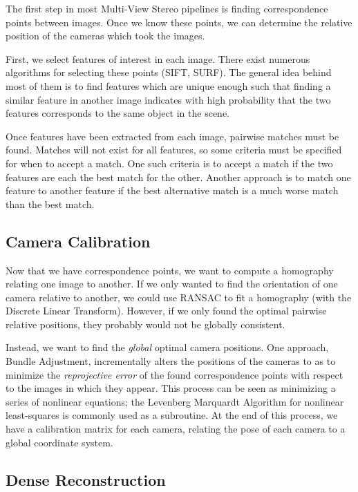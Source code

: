 \documentclass[10pt,twocolumn,letterpaper]{article}
\begin{document}
The first step in most Multi-View Stereo pipelines is finding correspondence points between images. Once we know these points, we can determine the relative position of the cameras which took the images.

First, we select features of interest in each image. There exist numerous algorithms for selecting these points (SIFT, SURF). The general idea behind most of them is to find features which are unique enough such that finding a similar feature in another image indicates with high probability that the two features corresponds to the same object in the scene.\cite{brown}

Once features have been extracted from each image, pairwise matches must be found. Matches will not exist for all features, so some criteria must be specified for when to accept a match. One such criteria is to accept a match if the two features are each the best match for the other. Another approach is to match one feature to another feature if the best alternative match is a much worse match than the best match.\cite{brown}

\subsection{Camera Calibration}

Now that we have correspondence points, we want to compute a homography relating one image to another. If we only wanted to find the orientation of one camera relative to another, we could use RANSAC to fit a homography (with the Discrete Linear Transform).\cite{ransac} However, if we only found the optimal pairwise relative positions, they probably would not be globally consistent.

Instead, we want to find the \emph{global} optimal camera positions. One approach, Bundle Adjustment, incrementally alters the positions of the cameras to as to minimize the \emph{reprojective error} of the found correspondence points with respect to the images in which they appear. This process can be seen as minimizing a series of nonlinear equations; the Levenberg Marquardt Algorithm for nonlinear least-squares is commonly used as a subroutine. At the end of this process, we have a calibration matrix for each camera, relating the pose of each camera to a global coordinate system.\cite{snavely, sba}

\subsection{Dense Reconstruction}
\end{document}
